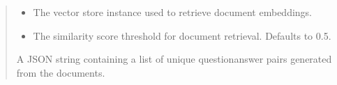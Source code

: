 \documentclass[letterpaper,10pt,english,openany,oneside]{sphinxmanual}
\begin{document}
\begin{fulllineitems}
\begin{quote}
\begin{description}
\begin{itemize}
\item {} 
\sphinxAtStartPar
{} \textendash{} The vector store instance used to retrieve document embeddings.

\item {} 
\sphinxAtStartPar
{} \textendash{} The similarity score threshold for document retrieval. Defaults to 0.5.

\end{itemize}

\sphinxAtStartPar
A JSON string containing a list of unique question\sphinxhyphen{}answer pairs generated from the documents.

\end{description}\end{quote}

\end{fulllineitems}

\end{document}
